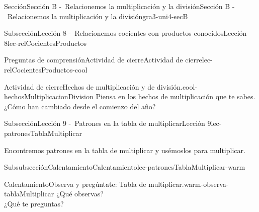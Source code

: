 \documentclass[twoside,10pt,]{article}
\begin{document}
\begin{sectionptx}{Sección}{Sección B -~Relacionemos la multiplicación y la división}{}{Sección B -~Relacionemos la multiplicación y la división}{}{}{gra3-uni4-secB}
\begin{subsectionptx}{Subsección}{Lección 8 -~Relacionemos cocientes con productos conocidos}{}{Lección 8}{}{}{lec-relCocientesProductos}
\typeout{************************************************}
%
\begin{reading-questions-subsubsection}{Preguntas de comprensión}{Actividad de cierre}{}{Actividad de cierre}{}{}{lec-relCocientesProductos-cool}
\begin{project}{Actividad de cierre}{Hechos de multiplicación y de división.}{cool-hechosMultiplicacionDivision}%
Piensa en los hechos de multiplicación que te sabes. ¿Cómo han cambiado desde el comienzo del año?%
\end{project}%
\end{reading-questions-subsubsection}
\end{subsectionptx}
%
%
\typeout{************************************************}
\typeout{************************************************}
%
\begin{subsectionptx}{Subsección}{Lección 9 -~Patrones en la tabla de multiplicar}{}{Lección 9}{}{}{lec-patronesTablaMultiplicar}
\begin{introduction}{}%
Encontremos patrones en la tabla de multiplicar y usémoslos para multiplicar.%
\end{introduction}%
%
%
\typeout{************************************************}
\typeout{************************************************}
%
\begin{subsubsectionptx}{Subsubsección}{Calentamiento}{}{Calentamiento}{}{}{lec-patronesTablaMultiplicar-warm}
\begin{exploration}{Calentamiento}{Observa y pregúntate: Tabla de multiplicar.}{warm-observa-tablaMultiplicar}%
¿Qué observas?\\
 ¿Qué te preguntas?%
\begin{image}{0}{1}{0}{}%

\end{image}
\end{exploration}
\end{subsubsectionptx}
\end{subsectionptx}
\end{sectionptx}
\end{document}
